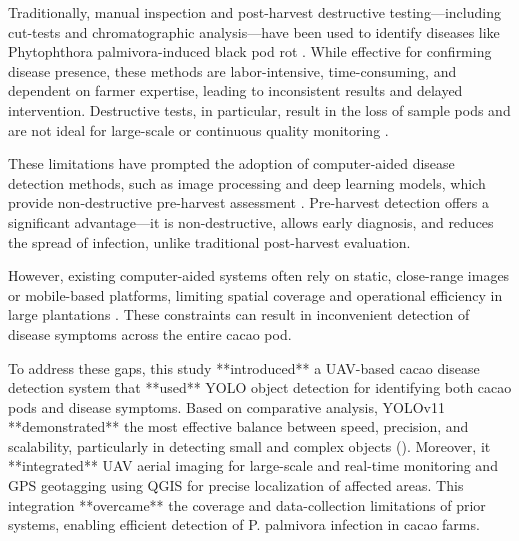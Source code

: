 Traditionally, manual inspection and post-harvest destructive testing—including cut-tests and chromatographic analysis—have been used to identify diseases like Phytophthora palmivora-induced black pod rot \citep{AceboGuerrero2012, Aneani2007}. While effective for confirming disease presence, these methods are labor-intensive, time-consuming, and dependent on farmer expertise, leading to inconsistent results and delayed intervention. Destructive tests, in particular, result in the loss of sample pods and are not ideal for large-scale or continuous quality monitoring \citep{Nguyen2022, Quelal2020}.

These limitations have prompted the adoption of computer-aided disease detection methods, such as image processing and deep learning models, which provide non-destructive pre-harvest assessment \citep{Alvarado2023, Silva2024}. Pre-harvest detection offers a significant advantage—it is non-destructive, allows early diagnosis, and reduces the spread of infection, unlike traditional post-harvest evaluation.

However, existing computer-aided systems often rely on static, close-range images or mobile-based platforms, limiting spatial coverage and operational efficiency in large plantations \citep{BaculioBarbosa2022, Tan2018}. These constraints can result in inconvenient detection of disease symptoms across the entire cacao pod.

To address these gaps, this study **introduced** a UAV-based cacao disease detection system that **used** YOLO object detection for identifying both cacao pods and disease symptoms. Based on comparative analysis, YOLOv11 **demonstrated** the most effective balance between speed, precision, and scalability, particularly in detecting small and complex objects (\citep{UltralyticsBlog2025}). Moreover, it **integrated** UAV aerial imaging for large-scale and real-time monitoring and GPS geotagging using QGIS for precise localization of affected areas. This integration **overcame** the coverage and data-collection limitations of prior systems, enabling efficient detection of P. palmivora infection in cacao farms.

